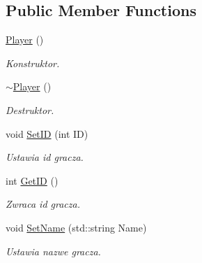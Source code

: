 \subsection*{Public Member Functions}
\begin{DoxyCompactItemize}
\item 
\mbox{\label{classtfp_1_1_player_aae80e75bc3d8b71256a8176e65e393b3}} 
\mbox{\hyperlink{classtfp_1_1_player_aae80e75bc3d8b71256a8176e65e393b3}{Player}} ()
\begin{DoxyCompactList}\small\item\em Konstruktor. \end{DoxyCompactList}\item 
\mbox{\label{classtfp_1_1_player_a9dd38f70e000bf5596636b55fd326e04}} 
\mbox{\hyperlink{classtfp_1_1_player_a9dd38f70e000bf5596636b55fd326e04}{$\sim$\+Player}} ()
\begin{DoxyCompactList}\small\item\em Destruktor. \end{DoxyCompactList}\item 
\mbox{\label{classtfp_1_1_player_a9e18ed6b2335d4f7206260f7d6cb3a87}} 
void \mbox{\hyperlink{classtfp_1_1_player_a9e18ed6b2335d4f7206260f7d6cb3a87}{Set\+ID}} (int ID)
\begin{DoxyCompactList}\small\item\em Ustawia id gracza. \end{DoxyCompactList}\item 
\mbox{\label{classtfp_1_1_player_aa21e13d6c0d6e44c40344aa1e31f2b4e}} 
int \mbox{\hyperlink{classtfp_1_1_player_aa21e13d6c0d6e44c40344aa1e31f2b4e}{Get\+ID}} ()
\begin{DoxyCompactList}\small\item\em Zwraca id gracza. \end{DoxyCompactList}\item 
\mbox{\label{classtfp_1_1_player_a18013b7cf6924783094eeb7db0d1cc15}} 
void \mbox{\hyperlink{classtfp_1_1_player_a18013b7cf6924783094eeb7db0d1cc15}{Set\+Name}} (std\+::string Name)
\begin{DoxyCompactList}\small\item\em Ustawia nazwe gracza. \end{DoxyCompactList}\item 

\end{DoxyCompactItemize}
